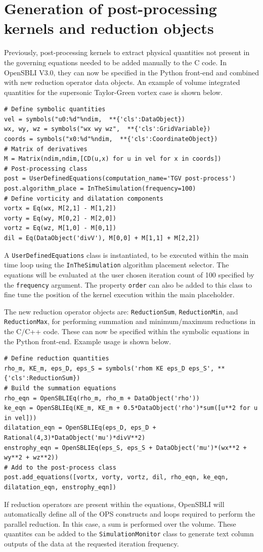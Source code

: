 \documentclass[11pt]{article}
\begin{document}
\section{Generation of post-processing kernels and reduction objects}
Previously, post-processing kernels to extract physical quantities not present in the governing equations needed to be added manually to the C code. In OpenSBLI V3.0, they can now be specified in the Python front-end and combined with new reduction operator data objects. An example of volume integrated quantities for the supersonic Taylor-Green vortex case is shown below.
\begin{lstlisting}
# Define symbolic quantities
vel = symbols("u0:%d"%ndim,  **{'cls':DataObject})
wx, wy, wz = symbols("wx wy wz",  **{'cls':GridVariable})
coords = symbols("x0:%d"%ndim,  **{'cls':CoordinateObject})
# Matrix of derivatives
M = Matrix(ndim,ndim,[CD(u,x) for u in vel for x in coords])
# Post-processing class
post = UserDefinedEquations(computation_name='TGV post-process')
post.algorithm_place = InTheSimulation(frequency=100)
# Define vorticity and dilatation components
vortx = Eq(wx, M[2,1] - M[1,2])
vorty = Eq(wy, M[0,2] - M[2,0])
vortz = Eq(wz, M[1,0] - M[0,1])
dil = Eq(DataObject('divV'), M[0,0] + M[1,1] + M[2,2])
\end{lstlisting}
A \verb|UserDefinedEquations| class is instantiated, to be executed within the main time loop using the \verb|InTheSimulation| algorithm placement selector. The equations will be evaluated at the user chosen iteration count of 100 specified by the \verb|frequency| argument. The property \verb|order| can also be added to this class to fine tune the position of the kernel execution within the main placeholder.

The new reduction operator objects are: \verb|ReductionSum|, \verb|ReductionMin|, and \verb|ReductionMax|, for performing summation and minimum/maximum reductions in the C/C++ code. These can now be specified within the symbolic equations in the Python front-end. Example usage is shown below.
\begin{lstlisting}
# Define reduction quantities
rho_m, KE_m, eps_D, eps_S = symbols('rhom KE eps_D eps_S', **{'cls':ReductionSum})
# Build the summation equations
rho_eqn = OpenSBLIEq(rho_m, rho_m + DataObject('rho'))
ke_eqn = OpenSBLIEq(KE_m, KE_m + 0.5*DataObject('rho')*sum([u**2 for u in vel]))
dilatation_eqn = OpenSBLIEq(eps_D, eps_D + Rational(4,3)*DataObject('mu')*divV**2)
enstrophy_eqn = OpenSBLIEq(eps_S, eps_S + DataObject('mu')*(wx**2 + wy**2 + wz**2))
# Add to the post-process class
post.add_equations([vortx, vorty, vortz, dil, rho_eqn, ke_eqn, dilatation_eqn, enstrophy_eqn])
\end{lstlisting}
If reduction operators are present within the equations, OpenSBLI will automatically define all of the OPS constructs and loops required to perform the parallel reduction. In this case, a sum is performed over the volume. These quantites can be added to the \verb|SimulationMonitor| class to generate text column outputs of the data at the requested iteration frequency.
\end{document}
